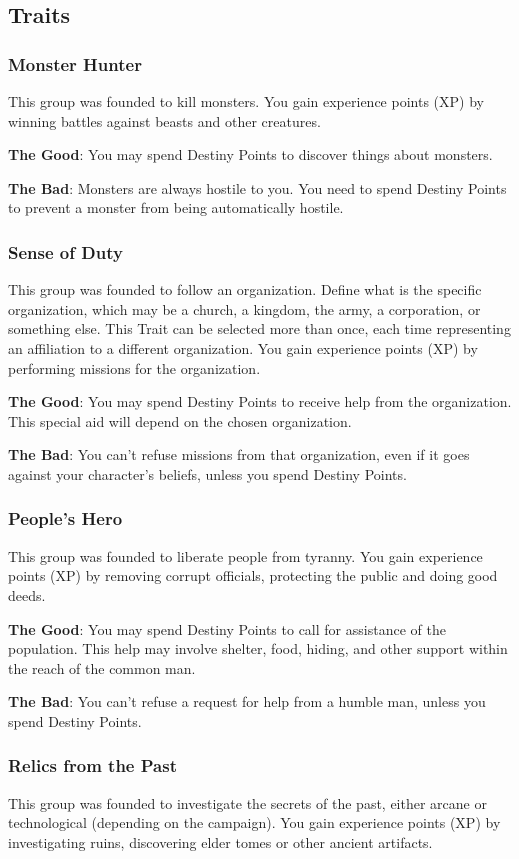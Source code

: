 \begin{multicols}{2}
\subsection{Traits}
\subsubsection{Monster Hunter}
This group was founded to kill monsters.
You gain experience points (XP) by winning battles
against beasts and other creatures.

\textbf{The Good}: You may spend Destiny Points
to discover things about monsters.

\textbf{The Bad}: Monsters are always hostile to
you. You need to spend Destiny Points to prevent a
monster from being automatically hostile.

\subsubsection{Sense of Duty}
This group was founded to follow an
organization. Define what is the specific
organization, which may be a church, a kingdom,
the army, a corporation, or something else. This
Trait can be selected more than once, each time
representing an affiliation to a different
organization. You gain experience points (XP) by
performing missions for the organization.

\textbf{The Good}: You may spend Destiny Points
to receive help from the organization. This special
aid will depend on the chosen organization.

\textbf{The Bad}: You can’t refuse missions from
that organization, even if it goes against your
character’s beliefs, unless you spend Destiny
Points.

\subsubsection{People’s Hero}
This group was founded to liberate people
from tyranny. You gain experience points (XP) by
removing corrupt officials, protecting the public
and doing good deeds.

\textbf{The Good}: You may spend Destiny Points
to call for assistance of the population. This help
may involve shelter, food, hiding, and other
support within the reach of the common man.

\textbf{The Bad}: You can’t refuse a request for
help from a humble man, unless you spend Destiny
Points.

\subsubsection{Relics from the Past}
This group was founded to investigate the
secrets of the past, either arcane or technological
(depending on the campaign). You gain experience
points (XP) by investigating ruins, discovering
elder tomes or other ancient artifacts.


\end{multicols}

